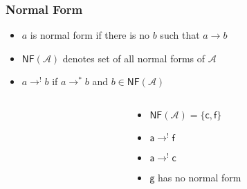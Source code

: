 \documentclass[12pt,aspectratio=169]{beamer}
\newcommand{\m}[1]{\mathsf{#1}}
\begin{document}
\begin{frame}
    \frametitle{Normal Form}
    \begin{definition}
        \begin{itemize}
            \item $a$ is \alert{normal form} if there is no $b$ such that $a \rightarrow b$
            \item \alert{$\mathsf{NF}(\mathcal{A})$} denotes set of all normal forms of $\mathcal{A}$
            \item \alert{$a \rightarrow^{!} b$} if $a \rightarrow^* b$ and $b \in \mathsf{NF}(\mathcal{A})$
        \end{itemize}
    \end{definition}

    \begin{example}
    \begin{columns}
        \begin{column}{0.35\textwidth}
            \centering
            \fig
        \end{column}
        \begin{column}{0.5\textwidth}
            \begin{itemize}
                \item $\mathsf{NF}(\mathcal{A}) = \{\m{c}, \m{f}\}$
                \item $\m{a} \rightarrow^! \m{f}$
                \item $\m{a} \rightarrow^! \m{c}$
                \item $\m{g}$ has no normal form
            \end{itemize}
        \end{column}
        \end{columns}
    \end{example}

\end{frame}
\end{document}
